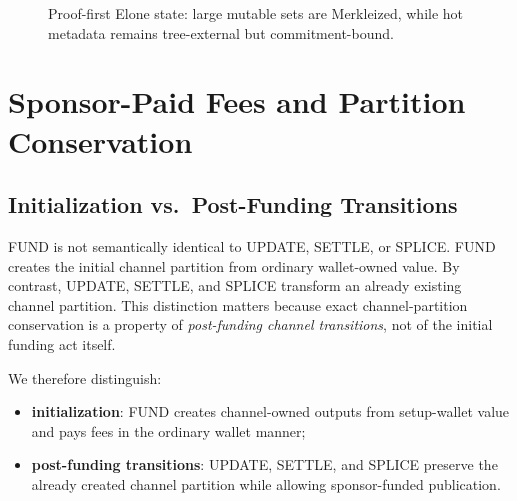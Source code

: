 \documentclass[11pt,a4paper]{article}
\newcommand{\code}[1]{\texttt{#1}}
\begin{document}
\begin{figure}[htbp]
\centering
{}
\caption{Proof-first Elone state: large mutable sets are Merkleized, while hot metadata remains tree-external but commitment-bound.}
\label{fig:state_header_commitment}
\end{figure}

\section{Sponsor-Paid Fees and Partition Conservation}

\subsection{Initialization vs.\ Post-Funding Transitions}

FUND is not semantically identical to UPDATE, SETTLE, or SPLICE. FUND creates the initial channel partition from ordinary wallet-owned value. By contrast, UPDATE, SETTLE, and SPLICE transform an already existing channel partition. This distinction matters because exact channel-partition conservation is a property of \emph{post-funding channel transitions}, not of the initial funding act itself.

We therefore distinguish:
\begin{itemize}
    \item \textbf{initialization}: FUND creates channel-owned outputs from setup-wallet value and pays fees in the ordinary wallet manner;
    \item \textbf{post-funding transitions}: UPDATE, SETTLE, and SPLICE preserve the already created channel partition while allowing sponsor-funded publication.
\end{itemize}
\end{document}
